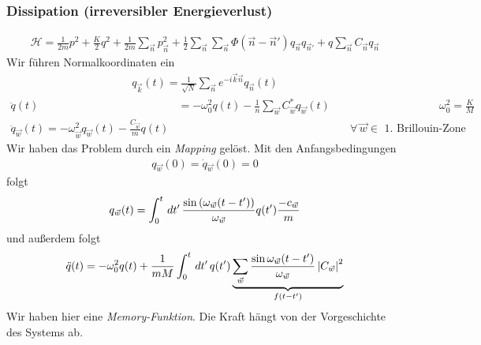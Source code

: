 \subsubsection*{Dissipation (irreversibler Energieverlust)}
%
\begin{align*}
  \mathcal{H} = \frac{1}{2m} p^2 + \frac{K}{2}q ^2 + \frac{1}{2m} \sum_{{\vec{n}}}^{}
  p^2_{\vec{n}} + \frac{1}{2} \sum_{{\vec{n}}}^{} \sum_{{\vec{n}}}^{} \Phi ({\vec{n}} - {\vec{n}}')
  q_{\vec{n}} q_{{\vec{n}}'} + q \sum_{{\vec{n}}}^{} C_{\vec{n}} q_{\vec{n}}
\end{align*}
%
Wir führen Normalkoordinaten ein
%
\begin{align*}
  q_{\vec{k}}(t) = \frac{1}{\sqrt{N}} \sum_{{\vec{n}}}^{} e^{- i {\vec{k}} {\vec{n}}}
  q_{{\vec{n}}}(t)
\end{align*}
%
%
\begin{align*}
  \ddot{q}(t) & = - \omega_0^2 q(t) - \frac{1}{n} \sum_{{\vec{w}}}^{}
  C_{{\vec{w}}}^{\ast} q_{{\vec{w}}}(t) && \omega_0^2 = \frac{K}{M} \\
  \ddot{q}_{\vec{w}}(t) = - \omega_{\vec{w}}^2 q_{\vec{w}}(t) - \frac{C_{\vec{w}}}{m} q(t)
  && \quad\forall\, {\vec{w}} \in \text{ 1. Brillouin-Zone}
\end{align*}
%
Wir haben das Problem durch ein \emph{Mapping} gelöst. Mit den Anfangsbedingungen
%
\begin{align*}
  q_{\vec{w}}(0) = \dot{q}_{\vec{w}}(0) = 0
\end{align*}
%
folgt
%
\begin{align*}
  q_{\vec{w}}(t) = \int_{0}^{t} \,dt'\, \frac{\sin{(\omega_{\vec{w}}(t-t'))}}{\omega_{\vec{w}}}
  q(t') \frac{- c_{\vec{w}}}{m}
\end{align*}
%
und außerdem folgt
%
\begin{align*}
  \ddot{q}(t) = - \omega_0^2 q(t) + \frac{1}{m M} \int_{0}^{t} \,dt'\, q(t')
  \underbrace{\sum_{{\vec{w}}}^{} \frac{\sin{\omega_{\vec{w}}(t - t')}}{\omega_{\vec{w}}} \left| C_{\vec{w}} \right|^2}_{f(t-t')}
\end{align*}
%
Wir haben hier eine \emph{Memory-Funktion}. Die Kraft hängt von der Vorgeschichte 
des Systems ab.

